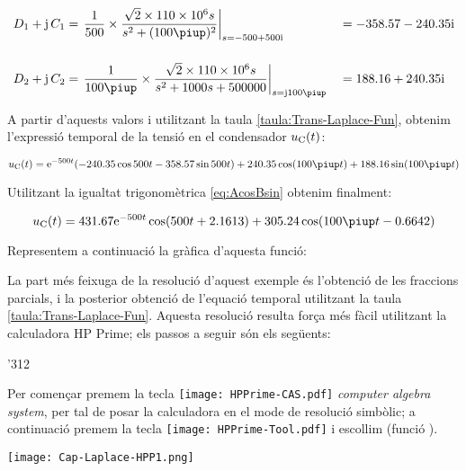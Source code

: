 \begin{exemple}[\CircuitLaplaceNul{}]
    \begin{alignat*}{2}
        D_1 + \ju\,C_1 &= \left.\frac{1}{500}\times \frac{\sqrt{2}\times 110\times 10^6 s}
        {s^2 +(100\piup)^2}\right|_{s=\complexnum{-500+j500}} &&= \complexnum{-358,57 -j 240,35}\\[3ex]
        D_2 + \ju\,C_2 &= \left.\frac{1}{100\piup}\times\frac{\sqrt{2}\times 110\times 10^6 s}
        {s^2 + 1000 s + 500000}\right|_{s=\ju 100\piup} &&= \complexnum{188,16 + j240,35}
    \end{alignat*}

    A partir d'aquests valors i utilitzant la taula
    \vref{taula:Trans-Laplace-Fun}, obtenim l'expressió temporal de la
    tensió en el condensador $u_\mathrm{C}(t)$:

    \[
        u\ped{C}(t) = \eu^{-500t} (\num{-240,35} \cos 500 t - \num{358,57} \sin 500
        t) + \num{240,35} \cos (100\piup t) + \num{188,16} \sin( 100\piup
        t)
    \]

    Utilitzant la igualtat trigonomètrica \eqref{eq:AcosBsin} obtenim finalment:

    \[
        u\ped{C}(t)= \num{431,67} \eu^{-500t} \cos(500 t +\num{2,1613}) + \num{305,24} \cos (100\piup t - \num{0,6642})
    \]

    Representem a continuació la gràfica d'aquesta
    funció:

    \begin{center}
      
    \end{center}

    La part més feixuga de la resolució d'aquest exemple és l'obtenció de les fraccions parcials, i la posterior obtenció de l'equació temporal utilitzant la taula \ref{taula:Trans-Laplace-Fun}. Aquesta resolució resulta força més fàcil utilitzant la calculadora \textsf{HP Prime};
    els passos a seguir són els següents:

    \begin{dingautolist}{'312}

        \item Per començar premem la tecla \texttt{[image: HPPrime-CAS.pdf]} \textit{computer algebra system}, per tal de posar la calculadora en el mode de resolució simbòlic; a continuació premem la tecla \texttt{[image: HPPrime-Tool.pdf]} i escollim  (funció ).

            \texttt{[image: Cap-Laplace-HPP1.png]}


\end{dingautolist}
\end{exemple}
